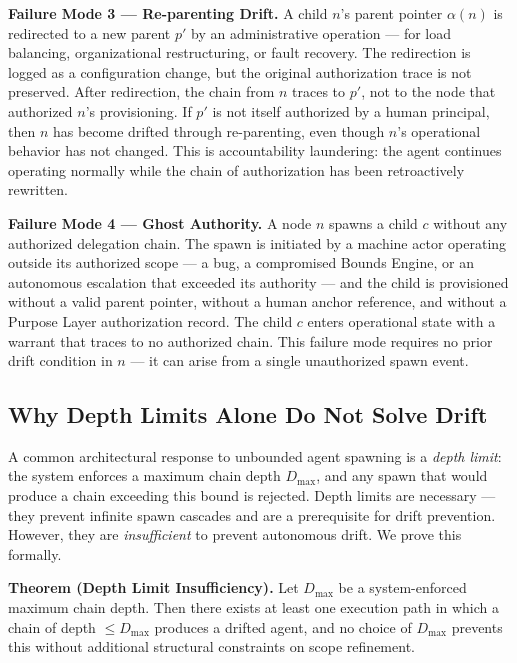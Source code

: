 \medskip
\noindent\textbf{Failure Mode 3 — Re-parenting Drift.}
A child $n$'s parent pointer $\alpha(n)$ is redirected to a new parent $p'$ by an administrative operation — for load balancing, organizational restructuring, or fault recovery. The redirection is logged as a configuration change, but the original authorization trace is not preserved. After redirection, the chain from $n$ traces to $p'$, not to the node that authorized $n$'s provisioning. If $p'$ is not itself authorized by a human principal, then $n$ has become drifted through re-parenting, even though $n$'s operational behavior has not changed. This is accountability laundering: the agent continues operating normally while the chain of authorization has been retroactively rewritten.

\medskip
\noindent\textbf{Failure Mode 4 — Ghost Authority.}
A node $n$ spawns a child $c$ without any authorized delegation chain. The spawn is initiated by a machine actor operating outside its authorized scope — a bug, a compromised Bounds Engine, or an autonomous escalation that exceeded its authority — and the child is provisioned without a valid parent pointer, without a human anchor reference, and without a Purpose Layer authorization record. The child $c$ enters operational state with a warrant that traces to no authorized chain. This failure mode requires no prior drift condition in $n$ — it can arise from a single unauthorized spawn event.

\subsection{Why Depth Limits Alone Do Not Solve Drift}
\label{sec:rs-drift-depth-limits}

A common architectural response to unbounded agent spawning is a \emph{depth limit}: the system enforces a maximum chain depth $D_{\max}$, and any spawn that would produce a chain exceeding this bound is rejected. Depth limits are necessary — they prevent infinite spawn cascades and are a prerequisite for drift prevention. However, they are \emph{insufficient} to prevent autonomous drift. We prove this formally.

\medskip
\noindent\textbf{Theorem (Depth Limit Insufficiency).}
Let $D_{\max}$ be a system-enforced maximum chain depth. Then there exists at least one execution path in which a chain of depth $\leq D_{\max}$ produces a drifted agent, and no choice of $D_{\max}$ prevents this without additional structural constraints on scope refinement.

